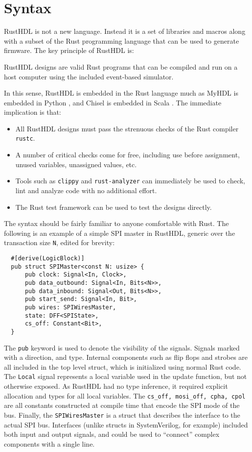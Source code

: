 \documentclass[sigplan,screen,sigconf]{acmart}
\begin{document}
\section{Syntax}
RustHDL is not a new language.  Instead it is a set of libraries and macros along with a 
subset of the Rust programming language that can be used to generate firmware.  The key
principle of RustHDL is:

\begin{tcolorbox}
RustHDL designs are valid Rust programs that can be compiled and run on a host computer
using the included event-based simulator.
\end{tcolorbox}

In this sense, RustHDL is embedded in the Rust language much as MyHDL is embedded in Python \cite{b3},
and Chisel is embedded in Scala \cite{b2}.  The immediate implication is that:
\begin{itemize}
  \item All RustHDL designs must pass the strenuous checks of the Rust compiler \verb|rustc|.
  \item A number of critical checks come for free, including use before assignment, 
  unused variables, unassigned values, etc.
  \item Tools such as \verb|clippy| and \verb|rust-analyzer| can immediately be used to
  check, lint and analyze code with no additional effort.
  \item The Rust test framework can be used to test the designs directly.
\end{itemize}

The syntax should be fairly familiar to anyone comfortable with Rust.  The following is an example
of a simple SPI master in RustHDL, generic over the transaction size \verb|N|, edited for brevity:

\begin{verbatim}
  #[derive(LogicBlock)]
  pub struct SPIMaster<const N: usize> {
      pub clock: Signal<In, Clock>,
      pub data_outbound: Signal<In, Bits<N>>,
      pub data_inbound: Signal<Out, Bits<N>>,
      pub start_send: Signal<In, Bit>,
      pub wires: SPIWiresMaster,
      state: DFF<SPIState>,
      cs_off: Constant<Bit>,
  }
\end{verbatim}  

The \verb|pub| keyword is used to denote the visibility of the signals.  Signals 
marked with a direction, and type.  Internal components such as flip flops and strobes
are all included in the top level struct, which is initialized using normal Rust code.
The \verb|Local| signal represents a local variable used in the update function, but
not otherwise exposed.  As RustHDL had no type inference, it required explicit allocation
and types for all local variables.  The \verb|cs_off, mosi_off, cpha, cpol| are all 
constants constructed at compile time that encode the SPI mode of the bus.  Finally, 
the \verb|SPIWiresMaster| is a struct that describes the interface to the actual SPI bus.
Interfaces (unlike structs in SystemVerilog, for example) included both input and output
signals, and could be used to ``connect'' complex components with a single line.  
\end{document}
